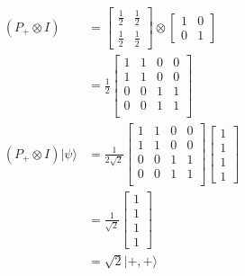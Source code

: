 \documentclass[main.tex]{subfiles}
\begin{document}
\begin{enumerate}
\begin{enumerate}
        \begin{align*}
            \left(P_{+}\otimes I\right) & = \left[\begin{array}{ll} \frac{1}{2} & \frac{1}{2} \\
                                        \frac{1}{2} & \frac{1}{2}\end{array}\right] 
                                        \otimes \left[\begin{array}{ll} 1 & 0 \\
                                        0 & 1\end{array}\right]\\
                                        & = \frac{1}{2}\left[\begin{array}{llll}1&1&0&0\\
                                        1&1&0&0\\
                                        0&0&1&1\\
                                        0&0&1&1\\\end{array}\right]\\
            \left(P_{+}\otimes I\right)
            |\psi\rangle                & = \frac{1}{2\sqrt{2}}\left[\begin{array}{llll}1&1&0&0\\
                                        1&1&0&0\\
                                        0&0&1&1\\
                                        0&0&1&1\\\end{array}\right]
                                        \left[\begin{array}{l}1\\1\\1\\1\end{array}\right]\\
                                        & = \frac{1}{\sqrt{2}} \left[\begin{array}{l}1\\1\\1\\1\end{array}\right]\\
                                        & = \sqrt{2} |+,+\rangle \tag{normalized}
        \end{align*}
    \end{enumerate}


\end{enumerate}
\end{document}

